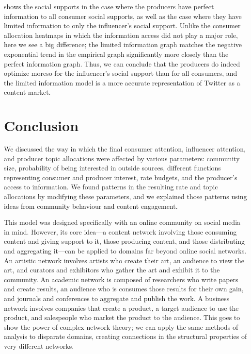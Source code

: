 \documentclass[11pt, letterpaper]{article}
\begin{document}
 shows the social supports in the case where the producers have perfect information to all consumer social supports, as well as the case where they have limited information to only the influencer's social support. Unlike the consumer allocation heatmaps in which the information access did not play a major role, here we see a big difference; the limited information graph matches the negative exponential trend in the empirical graph significantly more closely than the perfect information graph. Thus, we can conclude that the producers do indeed optimize moreso for the influencer's social support than for all consumers, and the limited information model is a more accurate representation of Twitter as a content market.

\pagebreak

\section{Conclusion}

We discussed the way in which the final consumer attention, influencer attention, and producer topic allocations were affected by various parameters: community size, probability of being interested in outside sources, different functions representing consumer and producer interest, rate budgets, and the producer's access to information. We found patterns in the resulting rate and topic allocations by modifying these parameters, and we explained those patterns using ideas from community behaviour and content engagement.

This model was designed specifically with an online community on social media in mind. However, its core idea---a content network involving those consuming content and giving support to it, those producing content, and those distributing and aggregating it---can be applied to domains far beyond online social networks. An artistic network involves artists who create their art, an audience to view the art, and curators and exhibitors who gather the art and exhibit it to the community. An academic network is composed of researchers who write papers and create results, an audience who is consumes those results for their own gain, and journals and conferences to aggregate and publish the work. A business network involves companies that create a product, a target audience to use the product, and salespeople who market the product to the audience. This goes to show the power of complex network theory; we can apply the same methods of analysis to disparate domains, creating connections in the structural properties of very different networks. 
\end{document}
